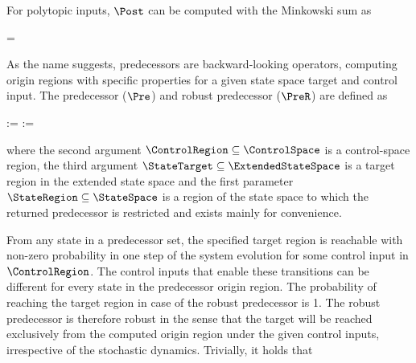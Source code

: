     For polytopic inputs, $\Post$ can be computed with the Minkowski sum as

    \startformula
         = \MatA \StateRegion \oplus \MatB \ControlRegion \oplus \RandomSpace \EndPeriod
    \stopformula

\stopsection


\startsubsection[title={Predecessors}]

    As the name suggests, predecessors are backward-looking operators, computing origin regions with specific properties for a given state space target and control input.
    The predecessor ($\Pre$) and robust predecessor ($\PreR$) are defined as

    \startformula
        \startalign[n=2,align={right,left}]
            \NC {} :=
            \NC {} \EndAnd
            \NR
            \NC {} :=
            \NC {} \EndComma
            \NR
        \stopalign
    \stopformula

    where the second argument $\ControlRegion \subseteq \ControlSpace$ is a control-space region, the third argument $\StateTarget \subseteq \ExtendedStateSpace$ is a target region in the extended state space and the first parameter $\StateRegion \subseteq \StateSpace$ is a region of the state space to which the returned predecessor is restricted and exists mainly for convenience.

    From any state in a predecessor set, the specified target region is reachable with non-zero probability in one step of the system evolution for some control input in $\ControlRegion$.
    The control inputs that enable these transitions can be different for every state in the predecessor origin region.
    The probability of reaching the target region in case of the robust predecessor is 1.
    The robust predecessor is therefore robust in the sense that the target will be reached exclusively from the computed origin region under the given control inputs, irrespective of the stochastic dynamics.
    Trivially, it holds that

    \startformula
         \subseteq {} \EndPeriod
    \stopformula

